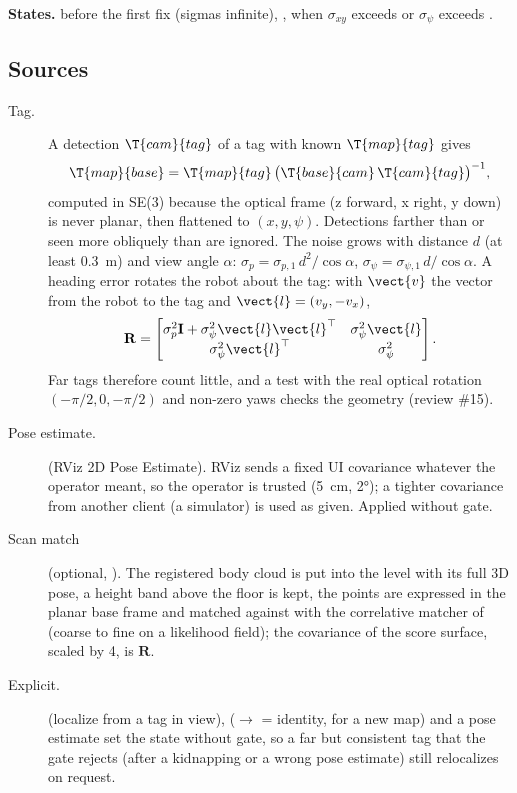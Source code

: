 \textbf{States.}  before the first fix (sigmas infinite), ,
 when $\sigma_{xy}$ exceeds  or $\sigma_\psi$
exceeds .

\subsection{Sources}

\begin{description}
  \item[Tag.] A detection $\T{cam}{tag}$ of a tag with known $\T{map}{tag}$ gives
    \begin{equation}
      \T{map}{base} = \T{map}{tag}\,\big(\T{base}{cam}\,\T{cam}{tag}\big)^{-1},
    \end{equation}
    computed in SE(3) because the optical frame (z forward, x right, y down) is never planar,
    then flattened to $(x, y, \psi)$. Detections farther than  or
    seen more obliquely than  are ignored. The noise grows with
    distance $d$ (at least 0.3~m) and view angle $\alpha$:
    $\sigma_p = \sigma_{p,1}\,d^2/\cos\alpha$, $\sigma_\psi = \sigma_{\psi,1}\,d/\cos\alpha$.
    A heading error rotates the robot about the tag: with $\vect{v}$ the vector from the robot
    to the tag and $\vect{l} = (v_y, -v_x)$,
    \begin{equation}
      \mathbf{R} = \begin{bmatrix} \sigma_p^2\mathbf{I} + \sigma_\psi^2\vect{l}\vect{l}^\top &
      \sigma_\psi^2\vect{l} \\ \sigma_\psi^2\vect{l}^\top & \sigma_\psi^2 \end{bmatrix}.
    \end{equation}
    Far tags therefore count little, and a test with the real optical rotation
    $(-\pi/2, 0, -\pi/2)$ and non-zero yaws checks the geometry (review \#15).
  \item[Pose estimate.]  (RViz 2D Pose Estimate). RViz sends a fixed UI
    covariance whatever the operator meant, so the operator is trusted (5~cm, 2°); a tighter
    covariance from another client (a simulator) is used as given. Applied without gate.
  \item[Scan match] (optional, ). The registered body cloud is put
    into the level  with its full 3D pose, a height band above the floor is kept, the
    points are expressed in the planar base frame and matched against  with the
    correlative matcher of ~\cite{olson2009csm} (coarse to fine on a
    likelihood field); the covariance of the score surface, scaled by 4, is $\mathbf{R}$.
  \item[Explicit.]  (localize from a tag in view),
     ($\to$ = identity, for a new map) and
    a pose estimate set the state without gate, so a far but consistent tag that the gate
    rejects (after a kidnapping or a wrong pose estimate) still relocalizes on request.
\end{description}

